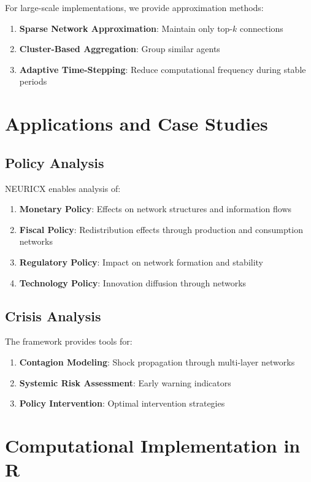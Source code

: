 \documentclass[12pt,a4paper]{article}
\begin{document}
For large-scale implementations, we provide approximation methods:

\begin{enumerate}
\item \textbf{Sparse Network Approximation}: Maintain only top-$k$ connections
\item \textbf{Cluster-Based Aggregation}: Group similar agents
\item \textbf{Adaptive Time-Stepping}: Reduce computational frequency during stable periods
\end{enumerate}

\section{Applications and Case Studies}

\subsection{Policy Analysis}

NEURICX enables analysis of:

\begin{enumerate}
\item \textbf{Monetary Policy}: Effects on network structures and information flows
\item \textbf{Fiscal Policy}: Redistribution effects through production and consumption networks
\item \textbf{Regulatory Policy}: Impact on network formation and stability
\item \textbf{Technology Policy}: Innovation diffusion through networks
\end{enumerate}

\subsection{Crisis Analysis}

The framework provides tools for:

\begin{enumerate}
\item \textbf{Contagion Modeling}: Shock propagation through multi-layer networks
\item \textbf{Systemic Risk Assessment}: Early warning indicators
\item \textbf{Policy Intervention}: Optimal intervention strategies
\end{enumerate}

\section{Computational Implementation in R}
\end{document}
